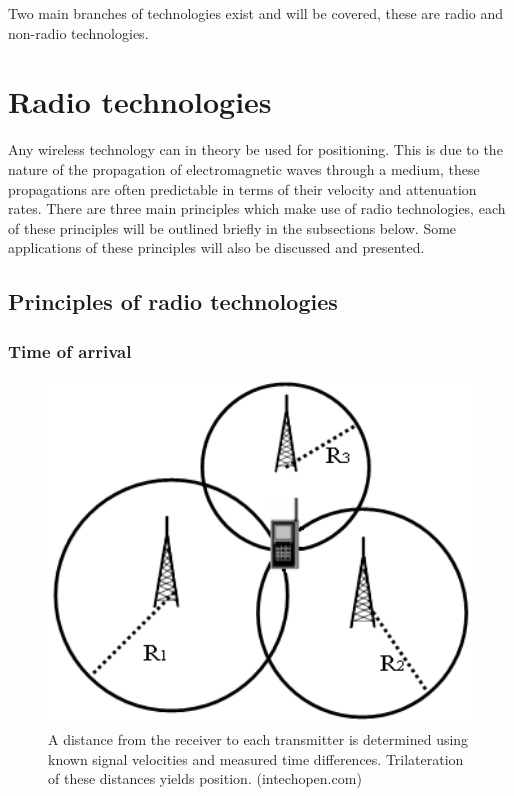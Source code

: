 \documentclass[11pt,a4paper]{report}
\begin{document}
	Two main branches of technologies exist and will be covered, these are radio and non-radio technologies.
	
	\section{Radio technologies}
		Any wireless technology can in theory be used for positioning. This is due to the nature of the propagation of electromagnetic waves through a medium, these propagations are often predictable in terms of their velocity and attenuation rates. There are three main principles which make use of radio technologies, each of these principles will be outlined briefly in the subsections below. Some applications of these principles will also be discussed and presented.
	
	\subsection{Principles of radio technologies}
		\label{radio_principles}
		\subsubsection{Time of arrival}
			\begin{figure}[H]
				\centering
				\includegraphics[width=1\textwidth]{time_of_arrival}
				\caption[Time of arrival]{A distance from the receiver to each transmitter is determined using known signal velocities and measured time differences. Trilateration of these distances yields position. (intechopen.com)}
				\label{fig:time_of_arrival}
			\end{figure}
			
\end{document}
